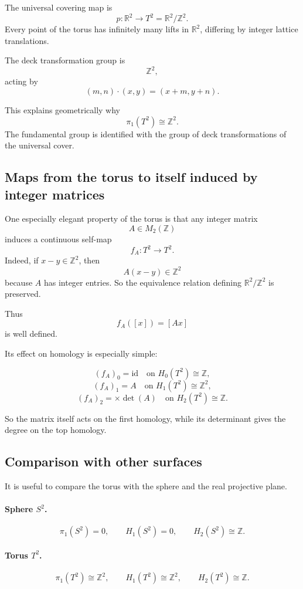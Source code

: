 \documentclass[12pt,a4paper]{article}
\theoremstyle{notespace}
\begin{document}
The universal covering map is
\[
p:\mathbb R^2\to T^2=\mathbb R^2/\mathbb Z^2.
\]
Every point of the torus has infinitely many lifts in \(\mathbb R^2\), differing by integer lattice translations.

The deck transformation group is
\[
\mathbb Z^2,
\]
acting by
\[
(m,n)\cdot (x,y)=(x+m,y+n).
\]

This explains geometrically why
\[
\pi_1(T^2)\cong \mathbb Z^2.
\]
The fundamental group is identified with the group of deck transformations of the universal cover.

\subsection{Maps from the torus to itself induced by integer matrices}

One especially elegant property of the torus is that any integer matrix
\[
A\in M_2(\mathbb Z)
\]
induces a continuous self-map
\[
f_A:T^2\to T^2.
\]
Indeed, if \(x-y\in \mathbb Z^2\), then
\[
A(x-y)\in \mathbb Z^2
\]
because \(A\) has integer entries. So the equivalence relation defining \(\mathbb R^2/\mathbb Z^2\) is preserved.

Thus
\[
f_A([x])=[Ax]
\]
is well defined.

Its effect on homology is especially simple:

\[
(f_A)_0=\mathrm{id}
\quad\text{on }H_0(T^2)\cong \mathbb Z,
\]
\[
(f_A)_1=A
\quad\text{on }H_1(T^2)\cong \mathbb Z^2,
\]
\[
(f_A)_2=\times \det(A)
\quad\text{on }H_2(T^2)\cong \mathbb Z.
\]

So the matrix itself acts on the first homology, while its determinant gives the degree on the top homology.

\subsection{Comparison with other surfaces}

It is useful to compare the torus with the sphere and the real projective plane.

\paragraph{Sphere \(S^2\).}
\[
\pi_1(S^2)=0,
\qquad
H_1(S^2)=0,
\qquad
H_2(S^2)\cong \mathbb Z.
\]

\paragraph{Torus \(T^2\).}
\[
\pi_1(T^2)\cong \mathbb Z^2,
\qquad
H_1(T^2)\cong \mathbb Z^2,
\qquad
H_2(T^2)\cong \mathbb Z.
\]
\end{document}
